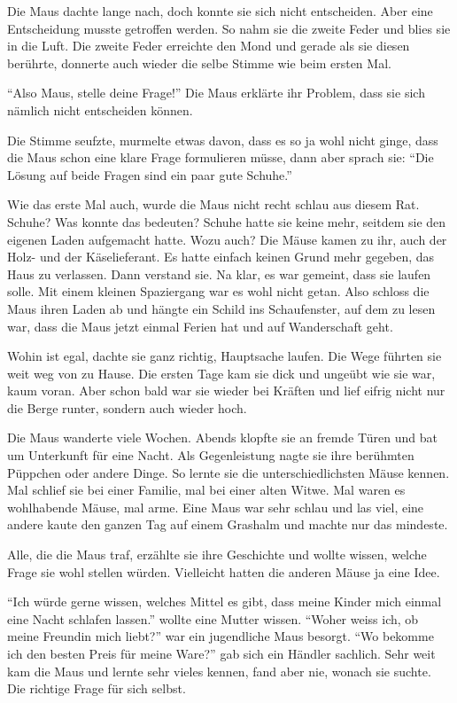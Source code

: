 Die Maus dachte lange nach, doch konnte sie sich nicht entscheiden. Aber eine Entscheidung musste getroffen werden.  So nahm sie die zweite Feder und blies sie in die Luft. Die zweite Feder erreichte den Mond und gerade als sie diesen berührte, donnerte auch wieder die selbe Stimme wie beim ersten Mal.

\enquote{Also Maus, stelle deine Frage!} Die Maus erklärte ihr Problem, dass sie sich nämlich nicht entscheiden können.

Die Stimme seufzte, murmelte etwas davon, dass es so ja wohl nicht ginge, dass die Maus schon eine klare Frage formulieren müsse, dann aber sprach sie: \enquote{Die Lösung auf beide Fragen sind ein paar gute Schuhe.}

Wie das erste Mal auch, wurde die Maus nicht recht schlau aus diesem Rat. Schuhe? Was konnte das bedeuten? Schuhe hatte sie keine mehr, seitdem sie den eigenen Laden aufgemacht hatte. Wozu auch? Die Mäuse kamen zu ihr, auch der Holz- und der Käselieferant. Es hatte einfach keinen Grund mehr gegeben, das Haus zu verlassen. Dann verstand sie. Na klar, es war gemeint, dass sie laufen solle. Mit einem kleinen Spaziergang war es wohl nicht getan. Also schloss die Maus ihren Laden ab und hängte ein Schild ins Schaufenster, auf dem zu lesen war, dass die Maus jetzt einmal Ferien hat und auf Wanderschaft geht.

Wohin ist egal, dachte sie ganz richtig, Hauptsache laufen. Die Wege führten sie weit weg von zu Hause. Die ersten Tage kam sie dick und ungeübt wie sie war, kaum voran. Aber schon bald war sie wieder bei Kräften und lief eifrig nicht nur die Berge runter, sondern auch wieder hoch.

Die Maus wanderte viele Wochen. Abends klopfte sie an fremde Türen und bat um Unterkunft für eine Nacht. Als Gegenleistung nagte sie ihre berühmten Püppchen oder andere Dinge. So lernte sie die unterschiedlichsten Mäuse kennen. Mal schlief sie bei einer Familie, mal bei einer alten Witwe. Mal waren es wohlhabende Mäuse, mal arme. Eine Maus war sehr schlau und las viel, eine andere kaute den ganzen Tag auf einem Grashalm und machte nur das mindeste.

Alle, die die Maus traf, erzählte sie ihre Geschichte und wollte wissen, welche Frage sie wohl stellen würden. Vielleicht hatten die anderen Mäuse ja eine Idee.

\enquote{Ich würde gerne wissen, welches Mittel es gibt, dass meine Kinder mich einmal eine Nacht schlafen lassen.} wollte eine Mutter wissen. \enquote{Woher weiss ich, ob meine Freundin mich liebt?} war ein jugendliche Maus besorgt. \enquote{Wo bekomme ich den besten Preis für meine Ware?} gab sich ein Händler sachlich. Sehr weit kam die Maus und lernte sehr vieles kennen, fand aber nie, wonach sie suchte. Die richtige Frage für sich selbst.


